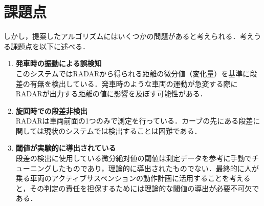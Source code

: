 \section{課題点}
しかし，提案したアルゴリズムにはいくつかの問題があると考えられる．考えうる課題点を以下に述べる．
\begin{enumerate}
    \item \textbf{発車時の振動による誤検知}\\
        このシステムではRADARから得られる距離の微分値（変化量）を基準に段差の有無を検出している．発車時のような車両の運動が急変する際にRADARが出力する距離の値に影響を及ぼす可能性がある．
    \item \textbf{旋回時での段差非検出}\\
        RADARは車両前面の1つのみで測定を行っている．カーブの先にある段差に関しては現状のシステムでは検出することは困難である．
    \item \textbf{閾値が実験的に導出されている}\\
        段差の検出に使用している微分絶対値の閾値は測定データを参考に手動でチューニングしたものであり，理論的に導出されたものでない．最終的に人が乗る車両のアクティブサスペンションの動作計画に活用することを考えると，その判定の責任を担保するためには理論的な閾値の導出が必要不可欠である．
\end{enumerate}
